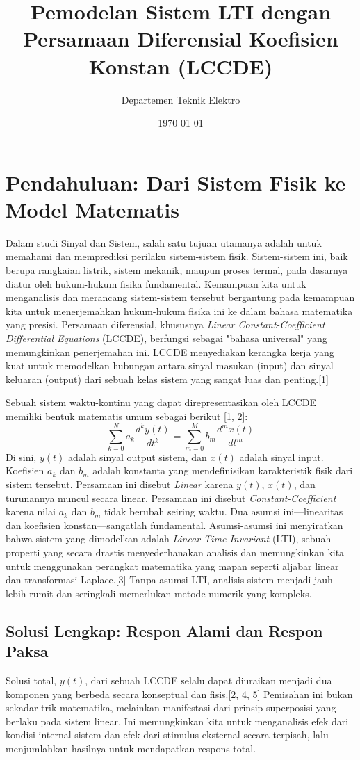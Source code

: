 \documentclass[12pt, a4paper]{article}
\title{Pemodelan Sistem LTI dengan Persamaan Diferensial Koefisien Konstan (LCCDE)}
\author{Departemen Teknik Elektro}
\date{\today}
\begin{document}
\maketitle
\tableofcontents
\newpage

\section{Pendahuluan: Dari Sistem Fisik ke Model Matematis}

Dalam studi Sinyal dan Sistem, salah satu tujuan utamanya adalah untuk memahami dan memprediksi perilaku sistem-sistem fisik. Sistem-sistem ini, baik berupa rangkaian listrik, sistem mekanik, maupun proses termal, pada dasarnya diatur oleh hukum-hukum fisika fundamental. Kemampuan kita untuk menganalisis dan merancang sistem-sistem tersebut bergantung pada kemampuan kita untuk menerjemahkan hukum-hukum fisika ini ke dalam bahasa matematika yang presisi. Persamaan diferensial, khususnya \textit{Linear Constant-Coefficient Differential Equations} (LCCDE), berfungsi sebagai "bahasa universal" yang memungkinkan penerjemahan ini. LCCDE menyediakan kerangka kerja yang kuat untuk memodelkan hubungan antara sinyal masukan (input) dan sinyal keluaran (output) dari sebuah kelas sistem yang sangat luas dan penting.[1]

Sebuah sistem waktu-kontinu yang dapat direpresentasikan oleh LCCDE memiliki bentuk matematis umum sebagai berikut [1, 2]:
\[
\sum_{k=0}^{N} a_k \frac{d^k y(t)}{dt^k} = \sum_{m=0}^{M} b_m \frac{d^m x(t)}{dt^m}
\]
Di sini, $y(t)$ adalah sinyal output sistem, dan $x(t)$ adalah sinyal input. Koefisien $a_k$ dan $b_m$ adalah konstanta yang mendefinisikan karakteristik fisik dari sistem tersebut. Persamaan ini disebut \textit{Linear} karena $y(t)$, $x(t)$, dan turunannya muncul secara linear. Persamaan ini disebut \textit{Constant-Coefficient} karena nilai $a_k$ dan $b_m$ tidak berubah seiring waktu. Dua asumsi ini—linearitas dan koefisien konstan—sangatlah fundamental. Asumsi-asumsi ini menyiratkan bahwa sistem yang dimodelkan adalah \textit{Linear Time-Invariant} (LTI), sebuah properti yang secara drastis menyederhanakan analisis dan memungkinkan kita untuk menggunakan perangkat matematika yang mapan seperti aljabar linear dan transformasi Laplace.[3] Tanpa asumsi LTI, analisis sistem menjadi jauh lebih rumit dan seringkali memerlukan metode numerik yang kompleks.

\subsection{Solusi Lengkap: Respon Alami dan Respon Paksa}
Solusi total, $y(t)$, dari sebuah LCCDE selalu dapat diuraikan menjadi dua komponen yang berbeda secara konseptual dan fisis.[2, 4, 5] Pemisahan ini bukan sekadar trik matematika, melainkan manifestasi dari prinsip superposisi yang berlaku pada sistem linear. Ini memungkinkan kita untuk menganalisis efek dari kondisi internal sistem dan efek dari stimulus eksternal secara terpisah, lalu menjumlahkan hasilnya untuk mendapatkan respons total.
\end{document}
